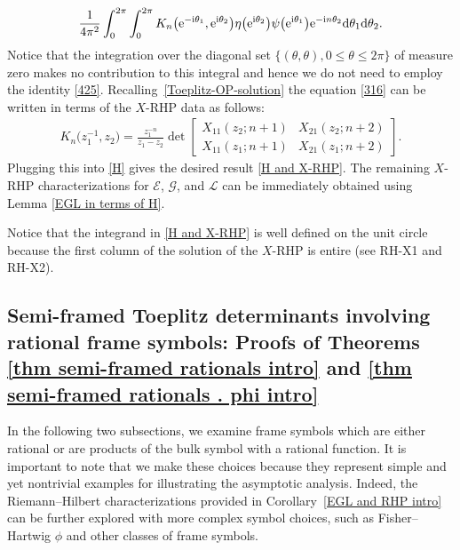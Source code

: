 \documentclass[10pt,a4paper]{amsart}
\numberwithin{equation}{section}
\newcommand{\ii}{{\rm i}}
\newcommand{\dd}{{\rm d}}
\begin{document}
		\begin{equation*} \frac{1}{4\pi^2} \int^{2\pi}_{0} \int^{2\pi}_{0} K_n\big({\rm e}^{-\ii \theta_1},{\rm e}^{\ii \theta_2}\big) \eta\big({\rm e}^{\ii \theta_2}\big) \psi\big({\rm e}^{\ii \theta_1}\big) {\rm e}^{-\ii n \theta_2} \dd \theta_1 \dd \theta_2.
		\end{equation*}
		Notice that the integration over the diagonal set $\{(\theta,\theta), 0 \leq \theta \leq 2 \pi\}$ of measure zero makes no contribution to this integral and hence we do not need to employ the identity \eqref{425}. Recalling~\eqref{Toeplitz-OP-solution} the equation \eqref{316} can be written in terms of the $X$-RHP data as follows:
		\begin{gather*}%
			K_{n}\big(z^{-1}_1,z_2\big) = \frac{z^{-n}_1}{z_1-z_2} \det \begin{bmatrix}
				X_{11}(z_2;n+1) & X_{21}(z_2;n+2) \\
				X_{11}(z_1;n+1) & X_{21}(z_1;n+2)
			\end{bmatrix}.
		\end{gather*}
		Plugging this into \eqref{H} gives the desired result \eqref{H and X-RHP}. 	The remaining $X$-RHP characterizations for $\mathscr{E}$, $\mathscr{G}$, and $\mathscr{L}$ can be immediately obtained using Lemma \ref{EGL in terms of H}.
		
		\begin{Remark} \normalfont
			Notice that the integrand in \eqref{H and X-RHP} is well defined on the unit circle because the first column of the solution of the $X$-RHP is entire (see {\rm RH-X1} and {\rm RH-X2}).
		\end{Remark}
		
\subsection[Semi-framed Toeplitz determinants involving rational frame symbols:\\ Proofs of Theorems \ref{thm semi-framed rationals intro} and \ref{thm semi-framed rationals . phi intro}]{Semi-framed Toeplitz determinants involving\\ rational frame symbols: Proofs of Theorems \ref{thm semi-framed rationals intro} and \ref{thm semi-framed rationals . phi intro}}\label{sec semi-framed}
		
In the following two subsections, we examine frame symbols which are either rational or are products of the bulk symbol with a rational function. It is important to note that we make these choices because they represent simple and yet nontrivial examples for illustrating the asymptotic analysis. Indeed, the Riemann--Hilbert characterizations provided in Corollary~\ref{EGL and RHP intro} can be further explored with more complex symbol choices, such as Fisher--Hartwig $\phi$ and other classes of frame symbols.
		
\end{document}
